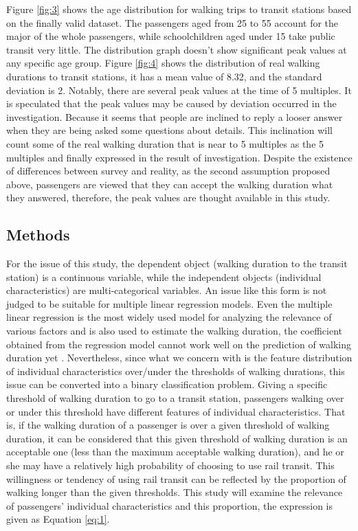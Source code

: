\documentclass[Journal,letterpaper]{ascelike-new}
\begin{document}
%
Figure \ref{fig:3} shows the age distribution for walking trips to transit stations based on the finally valid dataset. The passengers aged from 25 to 55 account for the major of the whole passengers, while schoolchildren aged under 15 take public transit very little. The distribution graph doesn't show significant peak values at any specific age group. Figure \ref{fig:4} shows the distribution of real walking durations to transit stations, it has a mean value of 8.32, and the standard deviation is 2. Notably, there are several peak values at the time of 5 multiples. It is speculated that the peak values may be caused by deviation occurred in the investigation. Because it seems that people are inclined to reply a looser answer when they are being asked some questions about details. This inclination will count some of the real walking duration that is near to 5 multiples as the 5 multiples and finally expressed in the result of investigation. Despite the existence of differences between survey and reality, as the second assumption proposed above, passengers are viewed that they can accept the walking duration what they answered, therefore, the peak values are thought available in this study.

%
\subsection{Methods}
For the issue of this study, the dependent object (walking duration to the transit station) is a continuous variable, while the independent objects (individual characteristics) are multi-categorical variables. An issue like this form is not judged to be suitable for multiple linear regression models. Even the multiple linear regression is the most widely used model for analyzing the relevance of various factors and is also used to estimate the walking duration, the coefficient obtained from the regression model cannot work well on the prediction of walking duration yet \cite{Krygsman2004}. Nevertheless, since what we concern with is the feature distribution of individual characteristics over/under the thresholds of walking durations, this issue can be converted into a binary classification problem. Giving a specific threshold of walking duration to go to a transit station, passengers walking over or under this threshold have different features of individual characteristics. That is, if the walking duration of a passenger is over a given threshold of walking duration, it can be considered that this given threshold of walking duration is an acceptable one (less than the maximum acceptable walking duration), and he or she may have a relatively high probability of choosing to use rail transit. This willingness or tendency of using rail transit can be reflected by the proportion of walking longer than the given thresholds. This study will examine the relevance of passengers' individual characteristics and this proportion, the expression is given as Equation \ref{eq:1}.
\end{document}

